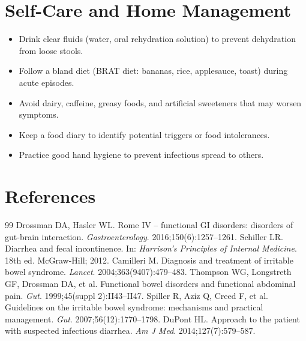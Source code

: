 \section*{Self-Care and Home Management}
\begin{itemize}
  \item Drink clear fluids (water, oral rehydration solution) to prevent dehydration from loose stools.
  \item Follow a bland diet (BRAT diet: bananas, rice, applesauce, toast) during acute episodes.
  \item Avoid dairy, caffeine, greasy foods, and artificial sweeteners that may worsen symptoms.
  \item Keep a food diary to identify potential triggers or food intolerances.
  \item Practice good hand hygiene to prevent infectious spread to others.
\end{itemize}

\section*{References}
\begin{thebibliography}{99}
Drossman DA, Hasler WL. Rome IV -- functional GI disorders: disorders of gut-brain interaction. \textit{Gastroenterology}. 2016;150(6):1257--1261.
Schiller LR. Diarrhea and fecal incontinence. In: \textit{Harrison's Principles of Internal Medicine}. 18th ed. McGraw-Hill; 2012.
Camilleri M. Diagnosis and treatment of irritable bowel syndrome. \textit{Lancet}. 2004;363(9407):479--483.
Thompson WG, Longstreth GF, Drossman DA, et al. Functional bowel disorders and functional abdominal pain. \textit{Gut}. 1999;45(suppl 2):II43--II47.
Spiller R, Aziz Q, Creed F, et al. Guidelines on the irritable bowel syndrome: mechanisms and practical management. \textit{Gut}. 2007;56(12):1770--1798.
DuPont HL. Approach to the patient with suspected infectious diarrhea. \textit{Am J Med}. 2014;127(7):579--587.
\end{thebibliography}
